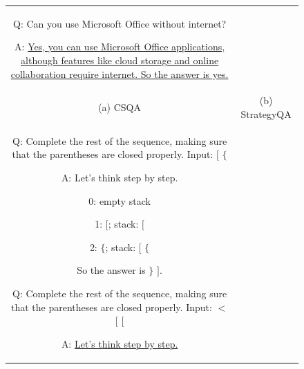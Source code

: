 \begin{figure}[!t]
\begin{tabular}{@{}c@{\hspace{0.02\textwidth}}c@{}}
\begin{tcolorbox}[
  breakable=false,
  width=0.45\textwidth,
  height=9cm,
  valign=top
]
{\vspace{0.5em}

Q: Can you use Microsoft Office without internet?

\vspace{0.2em}

A: \textcolor[RGB]{154,245,175}{\uline{
Yes, you can use Microsoft Office applications,
although features like cloud storage and online
collaboration require internet.
}}
\uline{So the answer is yes.}

\par}
\end{tcolorbox}

\\[-0.2em]

{\small (a) CSQA}
&
{\small (b) StrategyQA}

\\[0.6em]

\begin{tcolorbox}[
  breakable=false,
  width=0.45\textwidth,
  height=9cm,
  valign=top
]
{\footnotesize
Q: Complete the rest of the sequence, making sure that
the parentheses are closed properly. Input: $[$ $\{$

\vspace{0.2em}

A: \textcolor[RGB]{154,245,175}{
Let's think step by step.
}

\vspace{0.1em}

0: empty stack

\vspace{0.1em}

1: $[$; stack: $[$

\vspace{0.1em}

2: $\{$; stack: $[$ $\{$

\vspace{0.1em}

So the answer is $\}$ $]$.

\vspace{0.5em}

Q: Complete the rest of the sequence, making sure that
the parentheses are closed properly. Input: $<$ $[$ $[$

\vspace{0.2em}

A: \uline{\textcolor[RGB]{154,245,175}{
Let's think step by step.
}}

\vspace{0.1em}

}
\end{tcolorbox}
\end{tabular}
\end{figure}
